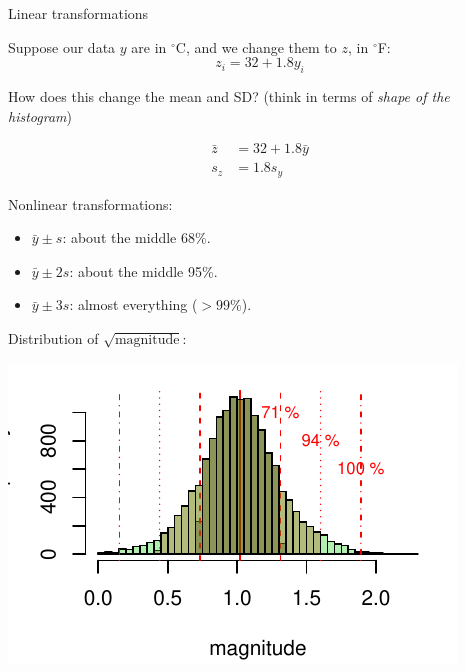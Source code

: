 \begin{frame}{Linear transformations}

    Suppose our data $y$ are in $^{\circ}$C, and we change them to $z$, in $^{\circ}$F:
    \[
        z_i = 32 + 1.8 y_i
    \]

    \vspace{2em}

    How does this change the mean and SD?
    (think in terms of \emph{shape of the histogram})

    \pause

    \begin{align*} 
        \bar z &= 32 + 1.8 \bar y  \\
        s_z &= 1.8 s_y
    \end{align*} 

\end{frame}


\begin{frame}{Nonlinear transformations:}

    \begin{itemize}
        \item $\bar y \pm s$: about the middle 68\%.
        \item $\bar y \pm 2s$: about the middle 95\%.
        \item $\bar y \pm 3s$: almost everything ($>99\%$).
    \end{itemize}

    Distribution of $\sqrt{\text{magnitude}}$:

    \includegraphics[width=\textwidth]{quakes-sqrt-hist-mean-sd}

\end{frame}



